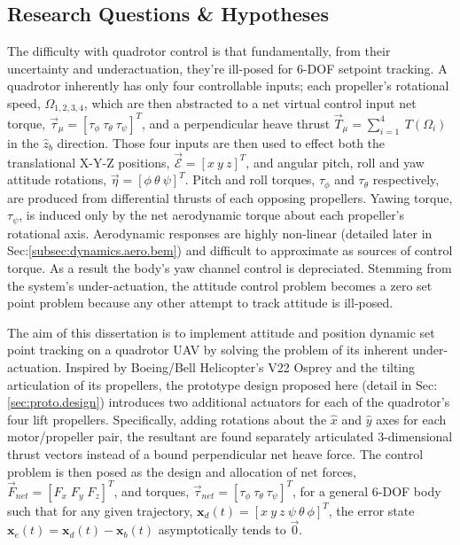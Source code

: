 \subsection{Research Questions \& Hypotheses}
\label{subsec:intro.foreword.hypotheses}
The difficulty with quadrotor control is that fundamentally, from their uncertainty and underactuation, they're ill-posed for 6-DOF setpoint tracking. A quadrotor inherently has only four controllable inputs; each propeller's rotational speed, $\Omega_{1,2,3,4}$, which are then abstracted to a net virtual control input net torque, $\vec{\tau}_\mu=[\tau_{\phi}~\tau_{\theta}~\tau_{\psi}]^T$, and a perpendicular heave thrust $\vec{T}_\mu=\sum_{i=1}^{4}~T(\Omega_i)$ in the $\hat{z}_b$ direction. Those four inputs are then used to effect both the translational X-Y-Z positions, $\vec{\mathcal{E}}=[x~y~z]^T$, and angular pitch, roll and yaw attitude rotations, $\vec{\eta}=[\phi~\theta~\psi]^T$. Pitch and roll torques, $\tau_{\phi}$ and $\tau_{\theta}$ respectively, are produced from differential thrusts of each opposing propellers. Yawing torque, $\tau_{\psi}$, is induced only by the net aerodynamic torque about each propeller's rotational axis. Aerodynamic responses are highly non-linear (detailed later in Sec:\ref{subsec:dynamics.aero.bem}) and difficult to approximate as sources of control torque. As a result the body's yaw channel control is depreciated. Stemming from the system's under-actuation, the attitude control problem becomes a zero set point problem because any other attempt to track attitude is ill-posed.
\par
The aim of this dissertation is to implement attitude and position dynamic set point tracking on a quadrotor UAV by solving the problem of its inherent under-actuation. Inspired by Boeing/Bell Helicopter's V22 Osprey and the tilting articulation of its propellers, the prototype design proposed here (detail in Sec:\ref{sec:proto.design}) introduces two additional actuators for each of the quadrotor's four lift propellers. Specifically, adding rotations about the $\hat{x}$ and $\hat{y}$ axes for each motor/propeller pair, the resultant are found separately articulated 3-dimensional thrust vectors instead of a bound perpendicular net heave force. The control problem is then posed as the design and allocation of net forces, $\vec{F}_{net} = [F_x\;F_y\;F_z]^T$, and torques, $\vec{\tau}_{net} = [\tau_{\phi}~\tau_{\theta}~\tau_{\psi}]^T$, for a general 6-DOF body such that for any given trajectory, $\mathbf{x}_d(t)=[x~y~z~\psi~\theta~\phi]^T$, the error state $\mathbf{x}_e(t) = \mathbf{x}_d(t) - \mathbf{x}_b(t)$ asymptotically tends to $\vec{0}$.
